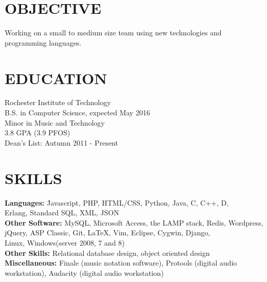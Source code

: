 \documentclass[line,margin]{res}
\begin{document}
\address{6000 Reynolds Dr, \#1482\\ Rochester, NY 14623}
\address{(646) 320-9143\\leeavital@gmail.com}


\begin{resume}
 
\section{OBJECTIVE}  Working on a small to medium size team using 
                     new technologies and programming languages.      
\section{EDUCATION}  Rochester Institute of Technology \\ 
                     B.S. in  Computer Science,  expected May 2016 \\
	                 Minor in Music and Technology\\
	                 3.8 GPA (3.9 PFOS) \\
	                 Dean's List: Autumn 2011 - Present
 
\section{SKILLS} 
 \vspace{-2ex}
	\begin{tabbing}
    {\bf Languages:} \hspace{.5in} 	\= Javascript,  PHP, HTML/CSS, Python, Java, C, C++, D, \\
				                    \> Erlang, Standard SQL, XML, JSON \\
	{\bf Other Software:}           \> MySQL, Microsoft Access, the LAMP stack, Redis, Wordpress,  \\ 
				                    \>	jQuery, ASP Classic, Git, LaTeX, Vim, Eclipse, Cygwin, Django, \\
				                    \>  Linux, Windows(server 2008, 7 and 8) \\
	
	{\bf Other Skills:} \> Relational database design, object oriented design \\
	
	{\bf Miscellaneous: } \> Finale (music notation software), Protools (digital audio \\ 
				 \>workstation),  Audacity (digital audio workstation)
	\end{tabbing}
	

\end{resume}
\end{document}
